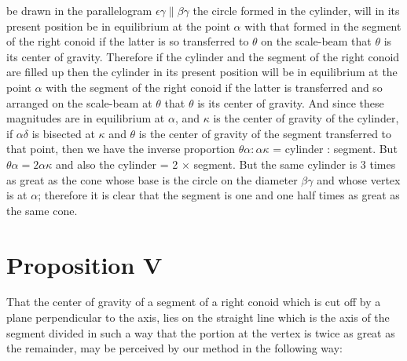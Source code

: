 \documentclass[12pt]{article}
\begin{document}
be drawn in the parallelogram $\epsilon\gamma \| \beta\gamma$ the
circle formed in the cylinder, will in its present position be in
equilibrium at the point $\alpha$ with that formed in the segment of
the right conoid if the latter is so transferred to $\theta$ on the
scale-beam that $\theta$ is its center of gravity. Therefore if the
cylinder and the segment of the right conoid are filled up then the
cylinder in its present position will be in equilibrium at the point
$\alpha$ with the segment of the right conoid if the latter is
transferred and so arranged on the scale-beam at $\theta$ that
$\theta$ is its center of gravity. And since these magnitudes are in
equilibrium at $\alpha$, and $\kappa$ is the center of gravity of the
cylinder, if $\alpha\delta$ is bisected at $\kappa$ and $\theta$ is
the center of gravity of the segment transferred to that point, then
we have the inverse proportion $\theta\alpha : \alpha\kappa$ =
cylinder : segment. But $\theta\alpha = 2\alpha\kappa$ and also the
cylinder = 2 $\times$ segment. But the same cylinder is 3 times as
great as the cone whose base is the circle on the diameter
$\beta\gamma$ and whose vertex is at $\alpha$; therefore it is clear
that the segment is one and one half times as great as the same cone.


\section*{Proposition V}

That the center of gravity of a segment of a right conoid which is cut
off by a plane perpendicular to the axis, lies on the straight line
which is the axis of the segment divided in such a way that the
portion at the vertex is twice as great as the remainder, may be
perceived by our method in the following way:
\end{document}
